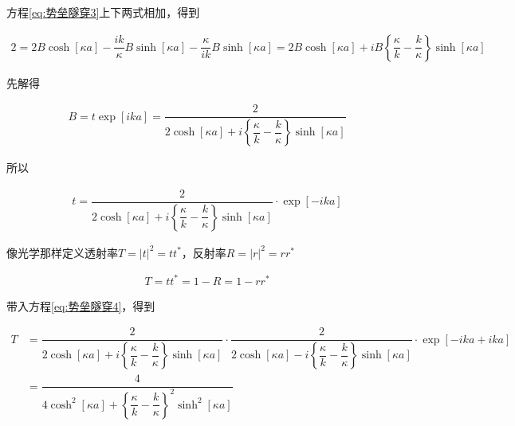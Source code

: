 方程\ref{eq:势垒隧穿3}上下两式相加，得到

\begin{equation*}
  \begin{aligned}
    2 = 2 B \cosh \left[ \kappa a \right] - \dfrac{i k}{\kappa} B \sinh \left[ \kappa a \right] - \dfrac{\kappa}{i k} B \sinh \left[ \kappa a \right] = 2 B \cosh \left[ \kappa a \right] + i B \left\{ \dfrac{\kappa}{k} - \dfrac{k}{\kappa}   \right\} \sinh \left[ \kappa a \right]
  \end{aligned}
\end{equation*}

先解得

\begin{equation*}
  \begin{aligned}
    B = t \exp \left[ i k a \right] = \dfrac{2}{2 \cosh \left[ \kappa a \right] + i \left\{ \dfrac{\kappa}{k} - \dfrac{k}{\kappa}   \right\} \sinh \left[ \kappa a \right]} 
  \end{aligned}
\end{equation*}

所以

\begin{equation}
  \label{eq:势垒隧穿4}
  \begin{aligned}
    t = \dfrac{2}{2 \cosh \left[ \kappa a \right] + i \left\{ \dfrac{\kappa}{k} - \dfrac{k}{\kappa}   \right\} \sinh \left[ \kappa a \right]} \cdot \exp \left[ -i ka \right]
  \end{aligned}
\end{equation}

像光学那样定义透射率$T=|t|^2= tt^{*}$，反射率$R=|r|^2=rr^{*}$

\begin{equation*}
  \begin{aligned}
    T = tt^{*} = 1 - R = 1 - rr^{*}
  \end{aligned}
\end{equation*}

带入方程\ref{eq:势垒隧穿4}，得到

\begin{equation*}
  \begin{aligned}
    T &= \dfrac{2}{2 \cosh \left[ \kappa a \right] + i \left\{ \dfrac{\kappa}{k} - \dfrac{k}{\kappa}   \right\} \sinh \left[ \kappa a \right]} \cdot \dfrac{2}{2 \cosh \left[ \kappa a \right] - i \left\{ \dfrac{\kappa}{k} - \dfrac{k}{\kappa}   \right\} \sinh \left[ \kappa a \right]} \cdot \exp \left[ -ika + ika \right] \\
    &= \dfrac{4}{4 \cosh^2 \left[ \kappa a \right] + \left\{ \dfrac{\kappa}{k} - \dfrac{k}{\kappa}   \right\}^2 \sinh^2 \left[ \kappa a \right]} 
  \end{aligned}
\end{equation*}

